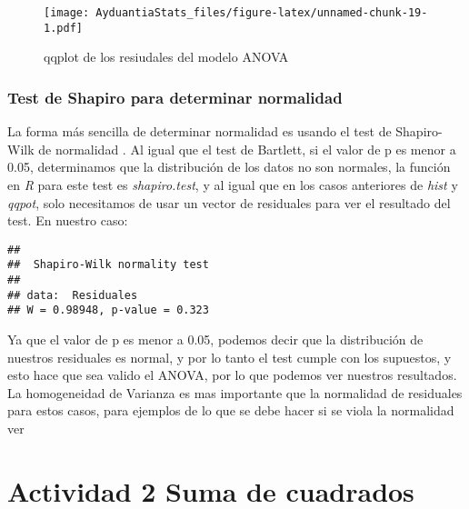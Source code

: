\documentclass[]{book}
\newenvironment{Shaded}{\begin{snugshade}}{\end{snugshade}}
\newcommand{\KeywordTok}[1]{\textcolor[rgb]{0.13,0.29,0.53}{\textbf{#1}}}
\newcommand{\NormalTok}[1]{#1}
\newcommand{\OperatorTok}[1]{\textcolor[rgb]{0.81,0.36,0.00}{\textbf{#1}}}
\begin{document}
\begin{figure}
\centering
\texttt{[image: AyduantiaStats\_files/figure-latex/unnamed-chunk-19-1.pdf]}
\caption{\label{fig:unnamed-chunk-19}qqplot de los resiudales del modelo ANOVA}
\end{figure}

\hypertarget{test-de-shapiro-para-determinar-normalidad}{%
\subsubsection{Test de Shapiro para determinar normalidad}\label{test-de-shapiro-para-determinar-normalidad}}

La forma más sencilla de determinar normalidad es usando el test de Shapiro-Wilk de normalidad \citep{royston1995remark}. Al igual que el test de Bartlett, si el valor de p es menor a 0.05, determinamos que la distribución de los datos no son normales, la función en \emph{R} para este test es \emph{shapiro.test}, y al igual que en los casos anteriores de \emph{hist} y \emph{qqpot}, solo necesitamos de usar un vector de residuales para ver el resultado del test. En nuestro caso:

\begin{Shaded}
\end{Shaded}

\begin{verbatim}
## 
##  Shapiro-Wilk normality test
## 
## data:  Residuales
## W = 0.98948, p-value = 0.323
\end{verbatim}

Ya que el valor de p es menor a 0.05, podemos decir que la distribución de nuestros residuales es normal, y por lo tanto el test cumple con los supuestos, y esto hace que sea valido el ANOVA, por lo que podemos ver nuestros resultados. La homogeneidad de Varianza es mas importante que la normalidad de residuales para estos casos, para ejemplos de lo que se debe hacer si se viola la normalidad ver \citet{lix1996consequences}

\hypertarget{actividad-2-suma-de-cuadrados}{%
\section{Actividad 2 Suma de cuadrados}\label{actividad-2-suma-de-cuadrados}}
\end{document}
